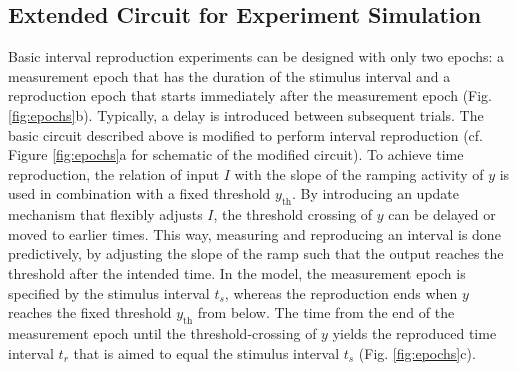 \documentclass[10pt]{article}
\begin{document}
\subsection{Extended Circuit for Experiment Simulation} %
Basic interval reproduction experiments can be designed with only two epochs: a measurement epoch that has the duration of the stimulus interval and a reproduction epoch that starts immediately after the measurement epoch (Fig. \ref{fig:epochs}b). Typically, a delay is introduced between subsequent trials. 
The basic circuit described above is modified to perform interval reproduction (cf. Figure \ref{fig:epochs}a for schematic of the modified circuit).
To achieve time reproduction, the relation of input $I$ with the slope of the ramping activity of $y$ is used in combination with a fixed threshold $y_{\text{th}}$.
By introducing an update mechanism that flexibly adjusts $I$, the threshold crossing of $y$ can be delayed or moved to earlier times.
This way, measuring and reproducing an interval is done predictively, by adjusting the slope of the ramp such that the output reaches the threshold after the intended time.
In the model, the measurement epoch is specified by the stimulus interval $t_s$, whereas the reproduction ends when $y$ reaches the fixed threshold $y_{\text{th}}$ from below. 
The time from the end of the measurement epoch until the threshold-crossing of $y$ yields the reproduced time interval $t_r$ that is aimed to equal the stimulus interval $t_s$ (Fig. \ref{fig:epochs}c).
\end{document}
